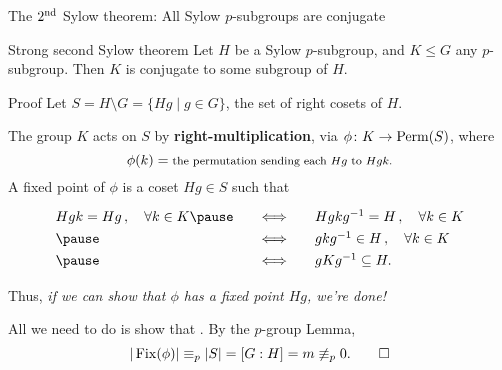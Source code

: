 \documentclass[8pt]{beamer}
\newcommand{\Pause}{\pause}      %
\begin{document}

\begin{frame}{The $2^{\rm nd}$ Sylow theorem: All Sylow $p$-subgroups are 
    conjugate} 

  \begin{block}{Strong second Sylow theorem}
    Let $H$ be a Sylow $p$-subgroup, and $K\leq G$ any
    $p$-subgroup. Then $K$ is conjugate to some subgroup of $H$.
  \end{block}  
  
  \begin{exampleblock}{Proof} %
    Let $S=H\!\setminus\!G=\{Hg\mid g\in G\}$, the set of right cosets of $H$.
    
    \Pause\medskip
    
    The group $K$ acts on $S$ by \textbf{right-multiplication}, via $\phi\colon
    K\to\operatorname{Perm}(S)$, where \vspace{-1mm}
    \[
    \phi(k)=\mbox{\footnotesize the permutation sending each $Hg$ to
      $Hgk$.}
    \]   
    \pause A {\color{xGreen}fixed point} of $\phi$ is a coset $Hg\in S$ such
    that \vspace{-1mm}
    \[
    \renewcommand{\arraystretch}{1.3}
    \begin{array}{lll}
      Hgk=Hg\,,\quad\forall k\in K\Pause\quad & \Longleftrightarrow\quad &
      Hgkg^{-1}=H\,,\quad\forall k\in K
      \\ \Pause \quad &\Longleftrightarrow\quad &
      gkg^{-1}\in H\,,\quad\forall k\in K
      \\ \Pause \quad &\Longleftrightarrow\quad &
      gKg^{-1}\subseteq H.
    \end{array}
    \]

  \Pause

  Thus, \emph{if we can show that $\phi$ has a fixed point $Hg$, we're done!}

  \pause\medskip

  All we need to do is show that
  . \Pause By the $p$-group Lemma,
  \[
  |\operatorname{Fix}(\phi)|\equiv_p|S|=[G:H]=m\not\equiv_p 0. \tag*{$\hfill\Box$}
  \]
  \end{exampleblock}
  
\end{frame}

\end{document}
